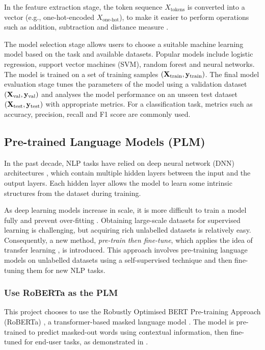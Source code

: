 In the feature extraction stage, the token sequence $X_\text{tokens}$ is converted into a vector (e.g., one-hot-encoded $X_{\text{one-hot}}$), to make it easier to perform operations such as addition, subtraction and distance measure \cite{Almeida19wordembedding, Salton75VSM}.

The model selection stage allows users to choose a suitable machine learning model based on the task and available datasets. Popular models include logistic regression, support vector machines (SVM), random forest and neural networks. The model is trained on a set of training samples $(\bold{X}_{\text{train}}, \bold{y}_{\text{train}})$. The final model evaluation stage tunes the parameters of the model using a validation dataset $(\bold{X}_\text{val}, \bold{y}_\text{val})$ and analyses the model performance on an unseen test dataset $(\bold{X}_\text{test}, \bold{y}_\text{test})$ with appropriate metrics. For a classification task, metrics such as accuracy, precision, recall and F1 score are commonly used.    

\subsection{Pre-trained Language Models (PLM)} 
In the past decade, NLP tasks have relied on deep neural network (DNN) architectures \cite{Yann15dnn}, which contain multiple hidden layers between the input and the output layers. Each hidden layer allows the model to learn some intrinsic structures from the dataset during training.

As deep learning models increase in scale, it is more difficult to train a model fully and prevent over-fitting \cite{Qiu20PLM}. Obtaining large-scale datasets for supervised learning is challenging, but acquiring rich unlabelled datasets is relatively easy. Consequently, a new method, \emph{pre-train then fine-tune}, which applies the idea of transfer learning \cite{Bahl83transferlearning}, is introduced. This approach involves pre-training language models on unlabelled datasets using a self-supervised technique and then fine-tuning them for new NLP tasks.

\subsubsection{Use RoBERTa as the PLM}
This project chooses to use the Robustly Optimised BERT Pre-training Approach (RoBERTa) \cite{Liu19roberta}, a transformer-based masked language model \cite{Raffel19PLM}. The model is pre-trained to predict masked-out words using contextual information, then fine-tuned for end-user tasks, as demonstrated in . 




